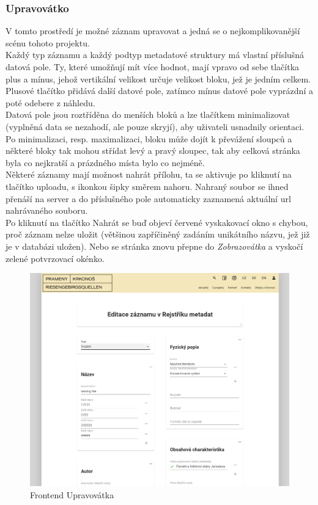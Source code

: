 \subsubsection{Upravovátko}
V tomto prostředí je možné záznam upravovat a jedná se o nejkomplikovanější scénu tohoto projektu.\\
Každý typ záznamu a každý podtyp metadatové struktury má vlastní příslušná datová pole.
Ty, které umožňují mít více hodnot, mají vpravo od sebe tlačítka plus a mínus,
jehož vertikální velikost určuje velikost bloku, jež je jedním celkem. Plusové tlačítko přidává
další datové pole, zatímco mínus datové pole vyprázdní a poté odebere z náhledu.
\\
Datová pole jsou roztříděna do menších bloků a lze tlačítkem minimalizovat
(vyplněná data se nezahodí, ale pouze skryjí), aby uživateli usnadnily orientaci.
Po minimalizaci, resp. maximalizaci, bloku může dojít k převážení
sloupců a některé bloky tak mohou střídat levý a pravý sloupec, tak aby celková stránka byla co nejkratší
a prázdného místa bylo co nejméně.\\
Některé záznamy mají možnost nahrát přílohu, ta se aktivuje po kliknutí na tlačítko uploadu, s ikonkou šipky
směrem nahoru. Nahraný soubor se ihned přenáší na server a do příslušného pole automaticky 
zaznamená aktuální url nahrávaného souboru.\\
Po kliknutí na tlačítko Nahrát se buď objeví červené vyskakovací okno s chybou, proč záznam nelze uložit
(většinou zapříčiněný zadáním unikátního názvu, jež již je v databázi uložen).
Nebo se stránka znovu přepne do \textit{Zobrazovátka} a vyskočí zelené potvrzovací okénko.
\begin{figure}[H]
	\centering
	\includegraphics[width=.8\linewidth]{img/editScene.png}
	\caption{Frontend Upravovátka}
\end{figure}

